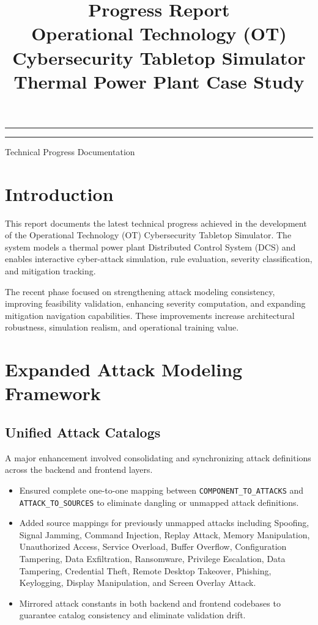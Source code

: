 \documentclass[12pt]{article}
\title{Progress Report\\
Operational Technology (OT) Cybersecurity Tabletop Simulator\\
Thermal Power Plant Case Study}
\author{}
\date{}
\makeatletter
\renewcommand{\maketitle}{
    \begin{center}
        \vspace*{-1cm}
        {\color{primary}\hrule\vspace{0.3cm}}
        {\Huge\bfseries\color{primary} \@title}
        {\vspace{0.3cm}\color{primary}\hrule}
        \vspace{0.8cm}
        {\Large\color{darkgray} Technical Progress Documentation}
        \vspace{1.5cm}
    \end{center}
}
\makeatother
\begin{document}
\maketitle
\onehalfspacing

\tableofcontents
\newpage

\section{Introduction}

\begin{highlight}
This report documents the latest technical progress achieved in the development of the Operational Technology (OT) Cybersecurity Tabletop Simulator. The system models a thermal power plant Distributed Control System (DCS) and enables interactive cyber-attack simulation, rule evaluation, severity classification, and mitigation tracking.
\end{highlight}

The recent phase focused on strengthening attack modeling consistency, improving feasibility validation, enhancing severity computation, and expanding mitigation navigation capabilities. These improvements increase architectural robustness, simulation realism, and operational training value.

\section{Expanded Attack Modeling Framework}

\subsection{Unified Attack Catalogs}

A major enhancement involved consolidating and synchronizing attack definitions across the backend and frontend layers.

\begin{itemize}[leftmargin=1.5em]
\item Ensured complete one-to-one mapping between \texttt{COMPONENT\_TO\_ATTACKS} and \texttt{ATTACK\_TO\_SOURCES} to eliminate dangling or unmapped attack definitions.
\item Added source mappings for previously unmapped attacks including Spoofing, Signal Jamming, Command Injection, Replay Attack, Memory Manipulation, Unauthorized Access, Service Overload, Buffer Overflow, Configuration Tampering, Data Exfiltration, Ransomware, Privilege Escalation, Data Tampering, Credential Theft, Remote Desktop Takeover, Phishing, Keylogging, Display Manipulation, and Screen Overlay Attack.
\item Mirrored attack constants in both backend and frontend codebases to guarantee catalog consistency and eliminate validation drift.
\end{itemize}
\end{document}
